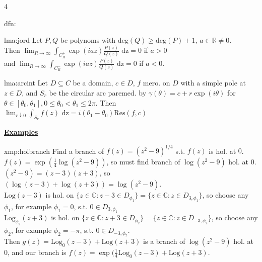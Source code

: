 \documentclass[landscape, 8pt]{extarticle}
\begin{document}
\begin{multicols*}{4}
\begin{dfn}{dfn:}{ }
			
		\end{dfn}
		
		
		\begin{lma}{lma:jord}{ }
			Let $P, Q$ be polynoms with deg$(Q) \ge$deg$(P) + 1$, $a \in \mathbb{R} \ne 0$.\\
			Then $\lim_{R\to \infty} \int_{C_R^+} \exp(iaz) \frac{P(z)}{Q(z)} \text{ dz} =0$ if $a > 0$\\
			and $\lim_{R\to \infty} \int_{C_R^-} \exp(iaz) \frac{P(z)}{Q(z)} \text{ dz} =0$ if $a < 0$.
			
			
		\end{lma}
		
		
		\begin{lma}{lma:arcint}{ }
			Let $D \subseteq C$ be a domain, $c \in D$, $f$ mero. on $D$ with a simple pole at $z \in D$, and $S_r$ be the circular arc paremed. by $\gamma(\theta) = c + r \exp(i\theta)$ for $\theta \in [\theta_0,\theta_1], 0 \le\theta_0 <\theta_1 \le 2 \pi$. Then $\lim_{r \downarrow 0} \int_{S_r} f(z) \text{ dz} = i(\theta_1 -\theta_0) \text{Res}(f, c)$
			
			
			
		\end{lma}
		
		
		
		
	{\footnotesize \textbf{\underline{Examples}}}
	
	
	
		\begin{xmp}{xmp:holbranch}{ }
			Find a branch of $f(z) = (z^2 - 9)^{1/4}$ s.t. $f(z)$ is hol. at $0$. $f(z) = \exp(\frac{1}{4} \log(z^2 - 9))$, so must find branch of $\log(z^2 -9)$ hol. at $0$.\\
			$(z^2 - 9) = (z-3)(z+3)$, so $\left(\log(z-3) + \log(z+3)\right) = \log(z^2 -9)$. \\
			$\text{Log}(z-3)$ is hol. on $\{z\in \mathbb{C} : z-3\in D_{\phi_1} \} = \{z\in \mathbb{C} : z\in D_{3, \phi_1} \}$, so choose any $\phi_1$, for example $\phi_1 = 0$, s.t. $0 \in D_{3, \phi_1}$\\ 
			$\text{Log}_{\phi_2}(z+3)$ is hol. on $\{z\in \mathbb{C} : z + 3\in D_{\phi _2}\} = \{z\in \mathbb{C} : z\in D_{-3, \phi_2}\}$, so choose any $\phi_2$, for example $\phi_2 = -\pi$, s.t. $0 \in D_{-3, \phi_2}$. \\
			Then $g(z) = \text{Log}_0(z-3) + \text{Log}(z+3)$ is a branch of $\log(z^2 - 9)$ hol. at $0$, and our branch is $f(z) = \exp(\frac{1}{4}\text{Log}_0(z-3) + \text{Log}(z+3)$.
			

\end{xmp}
\end{multicols*}
\end{document}

